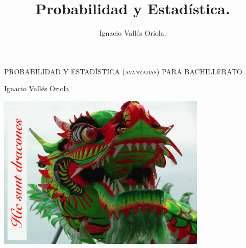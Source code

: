 \documentclass[a4paper, 12pt, spanish]{book}
\title{Probabilidad y Estadística.}
\author{Ignacio Vallés Oriola.}
\date{}
\numberwithin{equation}{chapter}
\numberwithin{teor}{chapter}
\numberwithin{coro}{chapter}
\numberwithin{prop}{chapter}
\numberwithin{defi}{chapter}
\numberwithin{axio}{chapter}
\numberwithin{ejem}{chapter}
\numberwithin{ejer}{chapter}
\numberwithin{ejre}{chapter}
\numberwithin{ayud}{chapter}
\numberwithin{solu}{chapter}
\numberwithin{prob}{chapter}
\begin{document}
\begin{titlepage}
	\centering
	\vspace*{\fill}
	{\scshape\LARGE PROBABILIDAD Y ESTADÍSTICA (avanzadas) PARA BACHILLERATO\par}
	\vspace{1cm}
	{\Large Ignacio Vallés Oriola \par}
	\vspace{3cm}
	\includegraphics[width=0.75\textwidth]{imagenes/hic-svnt-dracones}
	\vspace{3cm}
\end{titlepage}

\tableofcontents








%
%
%
%
\appendix

		
\end{document}
